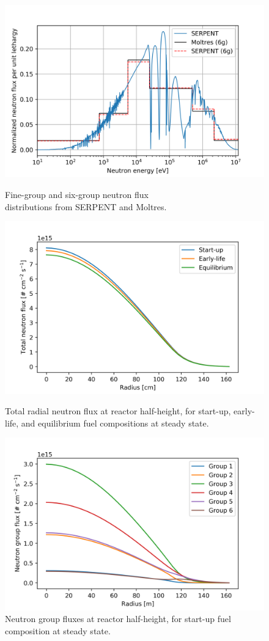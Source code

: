 \documentclass{anstrans}
\begin{document}
\begin{figure}[htbp] 
	\centering
	\includegraphics[width=.48\textwidth]{./figures/nt-spec}
	\captionsetup{justification=centering}
	\caption{Fine-group and six-group neutron flux\\ distributions from SERPENT
	and Moltres.}
	\label{fig:ntflux}
	\centering
	\includegraphics[width=.48\textwidth]{./figures/totalflux}
	\captionsetup{justification=centering}
	\caption{Total radial neutron flux at reactor half-height, for start-up,
	early-life, and equilibrium fuel compositions at steady state.}
	\label{fig:totalflux}
	\centering
	\includegraphics[width=.48\textwidth]{./figures/stflux}
	\captionsetup{justification=centering}
	\caption{Neutron group fluxes at reactor half-height, for start-up
	fuel composition at steady state.}
	\label{fig:stflux}
\end{figure}
%
\end{document}
